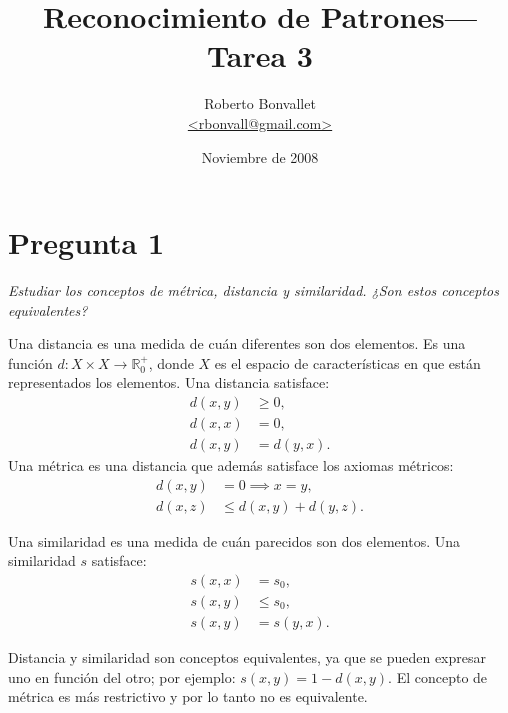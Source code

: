\documentclass[spanish]{article}
\title{Reconocimiento de Patrones---Tarea 3}
\author{Roberto Bonvallet \\ \url {<rbonvall@gmail.com>}}
\date{Noviembre de 2008}
\newcommand{\pregunta}{\textit}
\newcommand{\R}{\mathbb{R}}
\begin{document}
\maketitle

\section*{Pregunta 1}
\pregunta{
    Estudiar los conceptos de métrica, distancia y similaridad.
    ¿Son estos conceptos equivalentes?
}

Una distancia es una medida de cuán diferentes son dos elementos.  Es una
función $d:X\times X\to\R_0^+$, donde $X$ es el espacio de características en
que están representados los elementos.  Una distancia satisface\footnotemark:
\begin{align*}
    d(x, y) &\ge 0, \\ d(x, x) &= 0, \\ d(x, y) &= d(y, x).
\end{align*}
Una métrica es una distancia que además satisface los axiomas métricos:
\begin{align*}
    d(x, y) &= 0\implies x = y, \\
    d(x, z) &\le d(x, y) + d(y, z).
\end{align*}

Una similaridad es una medida de cuán parecidos son dos elementos.  Una similaridad $s$ satisface:
\begin{align*}
    s(x, x) &= s_0, \\
    s(x, y) &\le s_0, \\
    s(x, y) &= s(y, x).
\end{align*}

Distancia y similaridad son conceptos equivalentes, ya que se pueden expresar uno en función del
otro; por ejemplo: $s(x, y) = 1 - d(x, y)$.  El concepto de métrica es más restrictivo y por lo
tanto no es equivalente.
\end{document}
